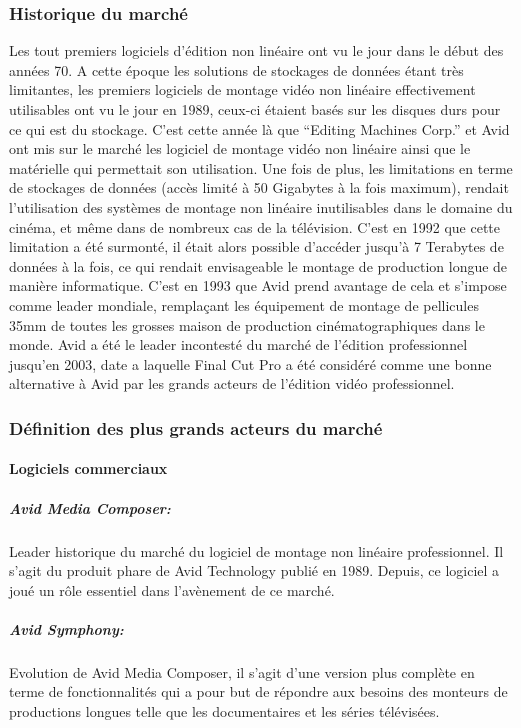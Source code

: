 \subsubsection {Historique du marché}
Les tout premiers logiciels d'édition non linéaire ont vu le jour dans le début des années 70.
A cette époque les solutions de stockages de données étant très limitantes, les premiers logiciels de montage
vidéo non linéaire effectivement utilisables ont vu le jour en 1989, ceux-ci étaient basés sur les disques durs
pour ce qui est du stockage. C'est cette année là que ``Editing Machines Corp.'' et Avid ont mis sur le
marché les logiciel de montage vidéo non linéaire ainsi que le matérielle qui permettait son
utilisation. Une fois de plus, les limitations en terme de stockages de données (accès limité à 50 Gigabytes
à la fois maximum), rendait l'utilisation des systèmes de montage non linéaire inutilisables dans le domaine
du cinéma, et même dans de nombreux cas de la télévision. C'est en 1992 que cette limitation a été surmonté,
il était alors possible d'accéder jusqu'à 7 Terabytes de données à la fois, ce qui rendait envisageable le montage
de production longue de manière informatique. C'est en 1993 que Avid prend avantage de cela et s'impose
comme leader mondiale, remplaçant les équipement de montage de pellicules 35mm de toutes les grosses maison
de production cinématographiques dans le monde. Avid a été le leader incontesté du marché de l'édition
professionnel jusqu'en 2003, date a laquelle Final Cut Pro a été considéré comme une bonne alternative
à Avid par les grands acteurs de l'édition vidéo professionnel.

\subsubsection{Définition des plus grands acteurs du marché}

\paragraph {Logiciels commerciaux}

\subparagraph{Avid Media Composer:}
Leader historique du marché du logiciel de montage non linéaire
professionnel. Il s'agit du produit phare de Avid Technology publié en 1989. Depuis, ce
logiciel a joué un rôle essentiel dans l'avènement de ce marché.

\subparagraph{Avid Symphony:}
Evolution de Avid Media Composer, il s'agit d'une version plus complète en terme
de fonctionnalités qui a pour but de répondre aux besoins des monteurs de productions longues telle que
les documentaires et les séries télévisées.

